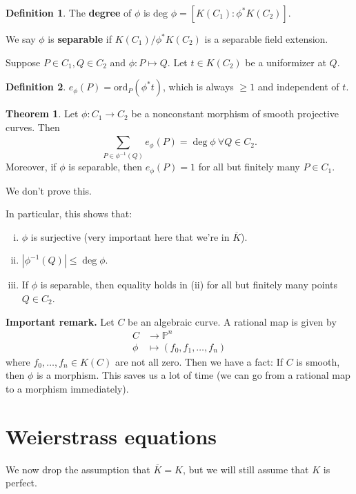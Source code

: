 \documentclass{article}
\theoremstyle{definition}
\newtheorem{theorem}{Theorem}[section]
\newtheorem{defn}{Definition}[section]
\begin{document}
\begin{defn}
    The \textbf{degree} of $\phi$ is $\text{deg }\phi = [K(C_1) : \phi^* K(C_2)]$.
    \vspace{1mm}
     
    We say $\phi$ is \textbf{separable} if $K(C_1)/\phi^* K(C_2)$ is a separable field extension.
\end{defn}

Suppose $P \in C_1, Q \in C_2$ and $\phi : P \mapsto Q$. Let $t \in K(C_2)$ be a uniformizer at $Q$.
\begin{defn}
    $e_{\phi}(P) = \text{ord}_P(\phi^* t)$, which is always $\ge 1$ and independent of $t$.
\end{defn}
\begin{theorem}\label{theorem2.3}
    Let $\phi : C_1 \to C_2$ be a nonconstant morphism of smooth projective curves. Then \[
    \sum_{P \in \phi^{-1}(Q)}^{} e_{\phi}(P) = \deg \phi ~\forall  Q \in C_2.
    \]
    Moreover, if $\phi$ is separable, then $e_{\phi}(P)=1$ for all but finitely many $P \in C_1$.
\end{theorem}
We don't prove this.
\vspace{1mm}
 
In particular, this shows that:
\begin{enumerate}[(i)]
    \item $\phi$ is surjective (very important here that we're in $\overline{K}$).
    \item $|\phi^{-1}(Q)|\le \deg \phi$.
    \item If $\phi$ is separable, then equality holds in (ii) for all but finitely many points $Q \in C_2$.
\end{enumerate}
\textbf{Important remark.} Let $C$ be an algebraic curve. A rational map is given by 
\begin{align*}
    C &\to \mathbb{P}^n \\
    \phi &\mapsto (f_0,f_1,\ldots,f_n)
\end{align*}
where $f_0,\ldots,f_n \in K(C)$ are not all zero. Then we have a fact: If $C$ is smooth, then $\phi$ is a morphism. This saves us a lot of time (we can go from a rational map to a morphism immediately).

\section{Weierstrass equations}

We now drop the assumption that $\overline{K} = K$, but we will still assume that $K$ is perfect.
\end{document}
